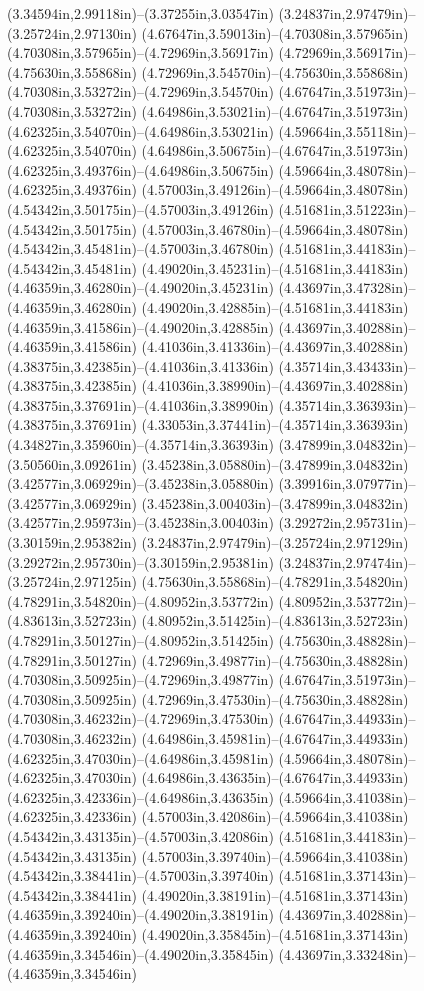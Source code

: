 (3.34594in,2.99118in)--(3.37255in,3.03547in) (3.24837in,2.97479in)--(3.25724in,2.97130in) (4.67647in,3.59013in)--(4.70308in,3.57965in) (4.70308in,3.57965in)--(4.72969in,3.56917in) (4.72969in,3.56917in)--(4.75630in,3.55868in) (4.72969in,3.54570in)--(4.75630in,3.55868in) (4.70308in,3.53272in)--(4.72969in,3.54570in) (4.67647in,3.51973in)--(4.70308in,3.53272in) (4.64986in,3.53021in)--(4.67647in,3.51973in) (4.62325in,3.54070in)--(4.64986in,3.53021in) (4.59664in,3.55118in)--(4.62325in,3.54070in) (4.64986in,3.50675in)--(4.67647in,3.51973in) (4.62325in,3.49376in)--(4.64986in,3.50675in) (4.59664in,3.48078in)--(4.62325in,3.49376in) (4.57003in,3.49126in)--(4.59664in,3.48078in) (4.54342in,3.50175in)--(4.57003in,3.49126in) (4.51681in,3.51223in)--(4.54342in,3.50175in) (4.57003in,3.46780in)--(4.59664in,3.48078in) (4.54342in,3.45481in)--(4.57003in,3.46780in) (4.51681in,3.44183in)--(4.54342in,3.45481in) (4.49020in,3.45231in)--(4.51681in,3.44183in) (4.46359in,3.46280in)--(4.49020in,3.45231in) (4.43697in,3.47328in)--(4.46359in,3.46280in) (4.49020in,3.42885in)--(4.51681in,3.44183in) (4.46359in,3.41586in)--(4.49020in,3.42885in) (4.43697in,3.40288in)--(4.46359in,3.41586in) (4.41036in,3.41336in)--(4.43697in,3.40288in) (4.38375in,3.42385in)--(4.41036in,3.41336in) (4.35714in,3.43433in)--(4.38375in,3.42385in) (4.41036in,3.38990in)--(4.43697in,3.40288in) (4.38375in,3.37691in)--(4.41036in,3.38990in) (4.35714in,3.36393in)--(4.38375in,3.37691in) (4.33053in,3.37441in)--(4.35714in,3.36393in) (4.34827in,3.35960in)--(4.35714in,3.36393in) (3.47899in,3.04832in)--(3.50560in,3.09261in) (3.45238in,3.05880in)--(3.47899in,3.04832in) (3.42577in,3.06929in)--(3.45238in,3.05880in) (3.39916in,3.07977in)--(3.42577in,3.06929in) (3.45238in,3.00403in)--(3.47899in,3.04832in) (3.42577in,2.95973in)--(3.45238in,3.00403in) (3.29272in,2.95731in)--(3.30159in,2.95382in) (3.24837in,2.97479in)--(3.25724in,2.97129in) (3.29272in,2.95730in)--(3.30159in,2.95381in) (3.24837in,2.97474in)--(3.25724in,2.97125in) (4.75630in,3.55868in)--(4.78291in,3.54820in) (4.78291in,3.54820in)--(4.80952in,3.53772in) (4.80952in,3.53772in)--(4.83613in,3.52723in) (4.80952in,3.51425in)--(4.83613in,3.52723in) (4.78291in,3.50127in)--(4.80952in,3.51425in) (4.75630in,3.48828in)--(4.78291in,3.50127in) (4.72969in,3.49877in)--(4.75630in,3.48828in) (4.70308in,3.50925in)--(4.72969in,3.49877in) (4.67647in,3.51973in)--(4.70308in,3.50925in) (4.72969in,3.47530in)--(4.75630in,3.48828in) (4.70308in,3.46232in)--(4.72969in,3.47530in) (4.67647in,3.44933in)--(4.70308in,3.46232in) (4.64986in,3.45981in)--(4.67647in,3.44933in) (4.62325in,3.47030in)--(4.64986in,3.45981in) (4.59664in,3.48078in)--(4.62325in,3.47030in) (4.64986in,3.43635in)--(4.67647in,3.44933in) (4.62325in,3.42336in)--(4.64986in,3.43635in) (4.59664in,3.41038in)--(4.62325in,3.42336in) (4.57003in,3.42086in)--(4.59664in,3.41038in) (4.54342in,3.43135in)--(4.57003in,3.42086in) (4.51681in,3.44183in)--(4.54342in,3.43135in) (4.57003in,3.39740in)--(4.59664in,3.41038in) (4.54342in,3.38441in)--(4.57003in,3.39740in) (4.51681in,3.37143in)--(4.54342in,3.38441in) (4.49020in,3.38191in)--(4.51681in,3.37143in) (4.46359in,3.39240in)--(4.49020in,3.38191in) (4.43697in,3.40288in)--(4.46359in,3.39240in) (4.49020in,3.35845in)--(4.51681in,3.37143in) (4.46359in,3.34546in)--(4.49020in,3.35845in) (4.43697in,3.33248in)--(4.46359in,3.34546in) 